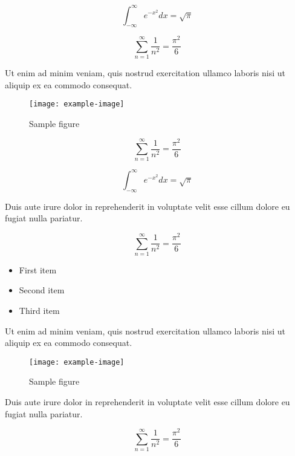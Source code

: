 \documentclass{article}
\begin{document}
\begin{equation}
    \int_{-\infty}^{\infty} e^{-x^2} dx = \sqrt{\pi}
\end{equation}

\begin{equation}
    \sum_{n=1}^{\infty} \frac{1}{n^2} = \frac{\pi^2}{6}
\end{equation}

Ut enim ad minim veniam, quis nostrud exercitation ullamco laboris nisi ut aliquip ex ea commodo consequat.

\begin{figure}[h]
    \centering
    \texttt{[image: example-image]}
    \caption{Sample figure}
    \label{fig:sample}
\end{figure}

\begin{equation}
    \sum_{n=1}^{\infty} \frac{1}{n^2} = \frac{\pi^2}{6}
\end{equation}

\begin{equation}
    \int_{-\infty}^{\infty} e^{-x^2} dx = \sqrt{\pi}
\end{equation}

Duis aute irure dolor in reprehenderit in voluptate velit esse cillum dolore eu fugiat nulla pariatur.


\begin{equation}
    \sum_{n=1}^{\infty} \frac{1}{n^2} = \frac{\pi^2}{6}
\end{equation}

\begin{itemize}
\item First item
\item Second item
\item Third item
\end{itemize}

Ut enim ad minim veniam, quis nostrud exercitation ullamco laboris nisi ut aliquip ex ea commodo consequat.

\begin{figure}[h]
    \centering
    \texttt{[image: example-image]}
    \caption{Sample figure}
    \label{fig:sample}
\end{figure}

Duis aute irure dolor in reprehenderit in voluptate velit esse cillum dolore eu fugiat nulla pariatur.

\begin{equation}
    \sum_{n=1}^{\infty} \frac{1}{n^2} = \frac{\pi^2}{6}
\end{equation}
\end{document}
